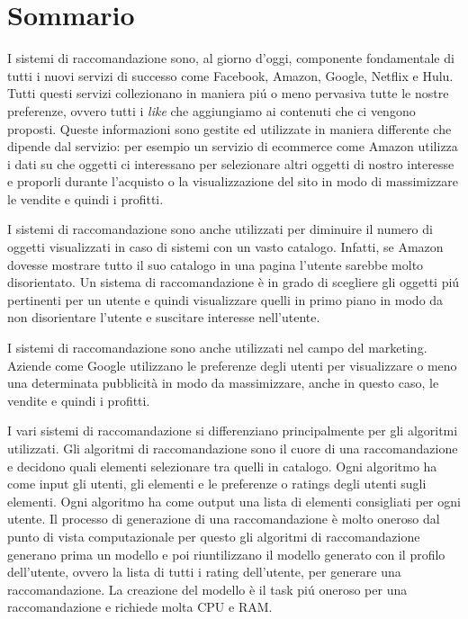 \chapter*{Sommario}

I sistemi di raccomandazione sono, al giorno d'oggi, componente fondamentale di tutti i nuovi servizi di successo come Facebook, Amazon, Google, Netflix e Hulu. Tutti questi servizi collezionano in maniera pi\'u o meno pervasiva tutte le nostre preferenze, ovvero tutti i \textit{like} che aggiungiamo ai contenuti che ci vengono proposti. Queste informazioni sono gestite ed utilizzate in maniera differente che dipende dal servizio: per esempio un servizio di ecommerce come Amazon utilizza i dati su che oggetti ci interessano per selezionare altri oggetti di nostro interesse e proporli durante l'acquisto o la visualizzazione del sito in modo di massimizzare le vendite e quindi i profitti.

I sistemi di raccomandazione sono anche utilizzati per diminuire il numero di oggetti visualizzati in caso di sistemi con un vasto catalogo. Infatti, se Amazon dovesse mostrare tutto il suo catalogo in una pagina l'utente sarebbe molto disorientato. Un sistema di raccomandazione è in grado di scegliere gli oggetti pi\'u pertinenti per un utente e quindi visualizzare quelli in primo piano in modo da non disorientare l'utente e suscitare interesse nell'utente.

I sistemi di raccomandazione sono anche utilizzati nel campo del marketing. Aziende come Google utilizzano le preferenze degli utenti per visualizzare o meno una determinata pubblicità in modo da massimizzare, anche in questo caso, le vendite e quindi i profitti.

I vari sistemi di raccomandazione si differenziano principalmente per gli algoritmi utilizzati. Gli algoritmi di raccomandazione sono il cuore di una raccomandazione e decidono quali elementi selezionare tra quelli in catalogo. Ogni algoritmo ha come input gli utenti, gli elementi e le preferenze o ratings degli utenti sugli elementi. Ogni algoritmo ha come output una lista di elementi consigliati per ogni utente. Il processo di generazione di una raccomandazione è molto oneroso dal punto di vista computazionale per questo gli algoritmi di raccomandazione generano prima un modello e poi riuntilizzano il modello generato con il profilo dell'utente, ovvero la lista di tutti i rating dell'utente, per generare una raccomandazione. La creazione del modello è il task pi\'u oneroso per una raccomandazione e richiede molta CPU e RAM.

